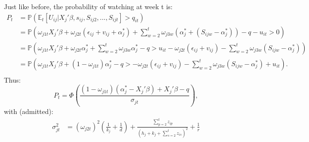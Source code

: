 Just like before, the probability of watching at week t is:
\begin{align*}
	P_{t}&=\mathbb{P}(\mathbb{E}_t[U_{i j}|X_{j}'\beta, s_{i j}, S_{i j 2}, ..., S_{i j t}]>q_{i t})\\
	&=\mathbb{P}\left(\omega_{j 1 t}X_{j}'\beta +\omega_{j 2 t}(\epsilon_{i j}+v_{i j}+\alpha_{j}^{*})+\sum_{w=2}^{t}\omega_{j 3 w}(\alpha_{j}^{*}+(S_{i j w}-\alpha_{j}^{*}))-q-u_{i t}>0\right)\\
	&=\mathbb{P}\left(\omega_{j 1 t}X_{j}'\beta +\omega_{j 2 t}\alpha_{j}^{*}+\sum_{w=2}^{t}\omega_{j 3 w}\alpha_{j}^{*}-q
	>u_{i t}-\omega_{j 2 t}(\epsilon_{i j}+v_{i j})-\sum_{w=2}^{t}\omega_{j 3 w}(S_{i j w}-\alpha_{j}^{*})\right)\\
	&=\mathbb{P}\left(\omega_{j 1 t}X_{j}'\beta +(1-\omega_{j 1 t})\alpha_{j}^{*}-q
	>-\omega_{j 2 t}(\epsilon_{i j}+v_{i j})-\sum_{w=2}^{t}\omega_{j 3 w}(S_{i j w}-\alpha_{j}^{*})+u_{i t}\right).\\
\end{align*}
Thus:
\begin{equation}
	P_{t}=\Phi\left(\frac{(1-\omega_{j 1 t})(\alpha_{j}^{*}-X_{j}'\beta)+X_{j}'\beta-q}{\sigma_{j t}}\right),
\end{equation}
with (admitted):
\begin{align*}
	\sigma_{j t}^{2}
	&=(\omega_{j 2 t })^{2}\left(\frac{1}{k_{j}}+\frac{1}{d}\right)+\frac{\sum_{p=2}^{t}z_{i p}}{(h_{j}+k_{j}+\sum_{s=2}^{t}z_{i s})^{2}}+\frac{1}{r}
\end{align*}
	
